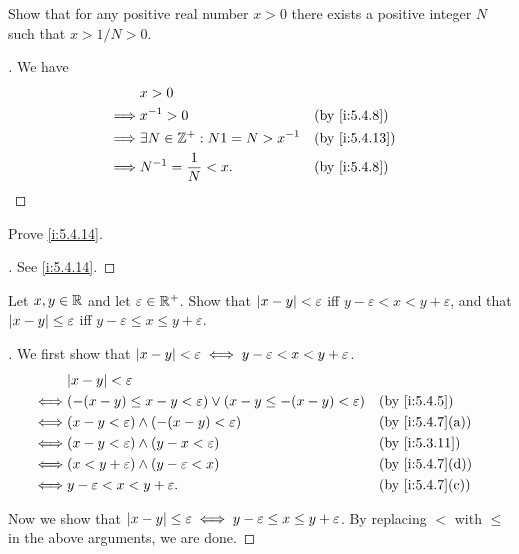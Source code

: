 \begin{ex}\label{i:ex:5.4.4}
  Show that for any positive real number \(x > 0\) there exists a positive integer \(N\) such that \(x > 1 / N > 0\).
\end{ex}

\begin{proof}[]
  We have
  \begin{align*}
             & x > 0                                                   \\
    \implies & x^{-1} > 0                           &  & \by{i:5.4.8}  \\
    \implies & \exists N \in \Z^+ : N1 = N > x^{-1} &  & \by{i:5.4.13} \\
    \implies & N^{-1} = \dfrac{1}{N} < x.           &  & \by{i:5.4.8}
  \end{align*}
\end{proof}

\begin{ex}\label{i:ex:5.4.5}
  Prove \cref{i:5.4.14}.
\end{ex}

\begin{proof}[]
  See \cref{i:5.4.14}.
\end{proof}

\begin{ex}\label{i:ex:5.4.6}
  Let \(x, y \in \mathbb{R}\) and let \(\varepsilon \in \mathbb{R}^+\).
  Show that \(\left\lvert x - y\right\rvert < \varepsilon\) iff \(y - \varepsilon < x < y + \varepsilon\), and that \(\left\lvert x - y\right\rvert \leq \varepsilon\) iff \(y - \varepsilon \leq x \leq y + \varepsilon\).
\end{ex}

\begin{proof}[]
  We first show that \(\left\lvert x - y\right\rvert < \varepsilon \iff y - \varepsilon < x < y + \varepsilon\).
  \begin{align*}
         & \abs{x - y} < \varepsilon                                                                               \\
    \iff & \pa{-(x - y) \leq x - y < \varepsilon} \lor \pa{x - y \leq -(x - y) < \varepsilon} &  & \by{i:5.4.5}    \\
    \iff & (x - y < \varepsilon) \land (-(x - y) < \varepsilon)                               &  & \by{i:5.4.7}[a] \\
    \iff & (x - y < \varepsilon) \land (y - x < \varepsilon)                                  &  & \by{i:5.3.11}   \\
    \iff & (x < y + \varepsilon) \land (y - \varepsilon < x)                                  &  & \by{i:5.4.7}[d] \\
    \iff & y - \varepsilon < x < y + \varepsilon.                                             &  & \by{i:5.4.7}[c]
  \end{align*}

  Now we show that \(\left\lvert x - y\right\rvert \leq \varepsilon \iff y - \varepsilon \leq x \leq y + \varepsilon\).
  By replacing \(<\) with \(\leq\) in the above arguments, we are done.
\end{proof}

